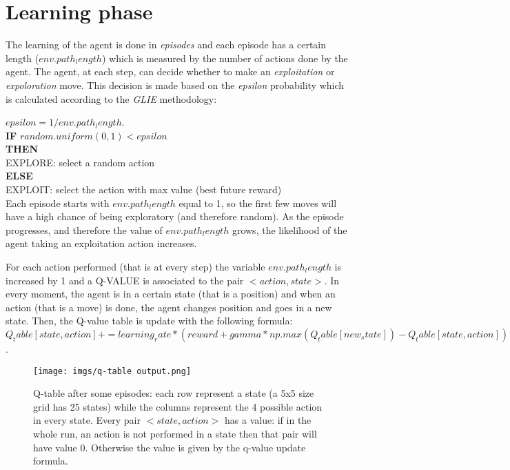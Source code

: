 \section{Learning phase}
The learning of the agent is done in \textit{episodes} and each episode has a certain length ($ env.path_length$) which is measured by the number of actions done by the agent.
The agent, at each step, can decide whether to make an \textit{exploitation} or \textit{expoloration} move. This decision is made based on the \textit{epsilon} probability which is calculated according to the \textit{GLIE} methodology: 

$epsilon = 1 / env.path_length$. \\ 
\textbf{IF} $random.uniform(0, 1) < epsilon $\\
\textbf{THEN}  \\
EXPLORE: select a random action \\ 
\textbf{ELSE}\\
EXPLOIT: select the action with max value (best future reward) \\

Each episode starts with $env.path_length$ equal to 1, so the first few moves will have a high chance of being exploratory (and therefore random). As the episode progresses, and therefore the value of $env.path_length$ grows, the likelihood of the agent taking an exploitation action increases.

For each action performed (that is at every step) the variable $env.path_length$ is increased by 1 and a Q-VALUE is associated to the pair $<action, state>$. 
In every moment, the agent is in a certain state (that is a position) and when an action (that is a move) is done, the agent changes position and goes in a new state. Then, the Q-value table is update with the following formula: $ Q_table[state, action] += learning_rate * (reward + gamma * np.max(Q_table[new_state]) - Q_table[state, action])$. 

\begin{figure}[h!]
	\centering
	\texttt{[image: imgs/q-table output.png]}
	\caption{Q-table after some episodes: each row represent a state (a 5x5 size grid has 25 states) while the columns represent the 4 possible action in every state. Every pair $<state, action>$ has a value: if in the whole run, an action is not performed in a state then that pair will have value 0. Otherwise the value is given by the q-value update formula.}
	\label{fig:q-}
\end{figure}

